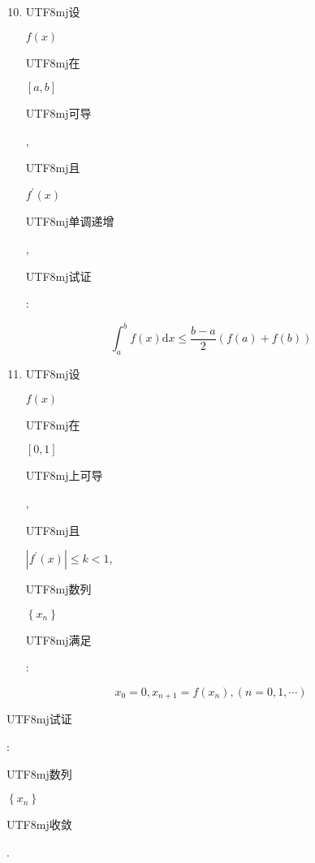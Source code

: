 \documentclass[10pt]{article}
\begin{document}
\begin{enumerate}
  \setcounter{enumi}{9}
  \item \begin{CJK}{UTF8}{mj}设\end{CJK} $f(x)$ \begin{CJK}{UTF8}{mj}在\end{CJK} $[a, b]$ \begin{CJK}{UTF8}{mj}可导\end{CJK}, \begin{CJK}{UTF8}{mj}且\end{CJK} $f^{\prime}(x)$ \begin{CJK}{UTF8}{mj}单调递增\end{CJK}, \begin{CJK}{UTF8}{mj}试证\end{CJK}:
\end{enumerate}
$$
\int_{a}^{b} f(x) \mathrm{d} x \leq \frac{b-a}{2}(f(a)+f(b))
$$

\begin{enumerate}
  \setcounter{enumi}{10}
  \item \begin{CJK}{UTF8}{mj}设\end{CJK} $f(x)$ \begin{CJK}{UTF8}{mj}在\end{CJK} $[0,1]$ \begin{CJK}{UTF8}{mj}上可导\end{CJK}, \begin{CJK}{UTF8}{mj}且\end{CJK} $\left|f^{\prime}(x)\right| \leq k<1$, \begin{CJK}{UTF8}{mj}数列\end{CJK} $\left\{x_{n}\right\}$ \begin{CJK}{UTF8}{mj}满足\end{CJK}:
\end{enumerate}
$$
x_{0}=0, x_{n+1}=f\left(x_{n}\right),(n=0,1, \cdots)
$$
\begin{CJK}{UTF8}{mj}试证\end{CJK}: \begin{CJK}{UTF8}{mj}数列\end{CJK} $\left\{x_{n}\right\}$ \begin{CJK}{UTF8}{mj}收敛\end{CJK}.
\end{document}
